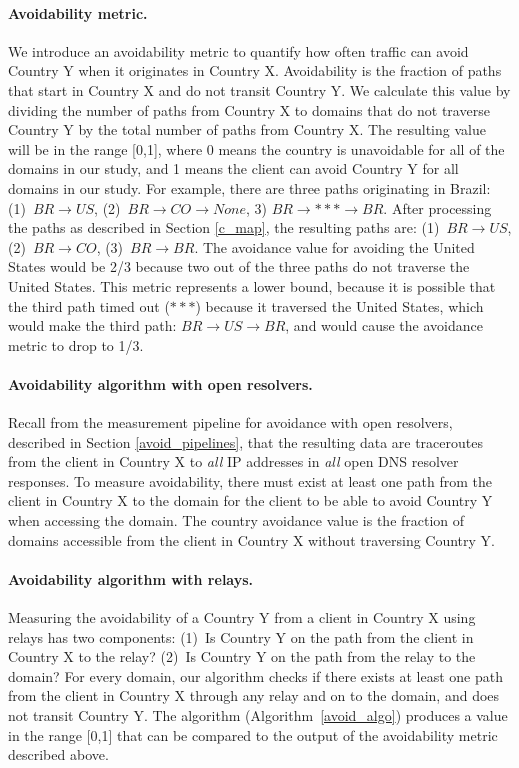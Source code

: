 \paragraph{Avoidability metric.}  We introduce an avoidability metric to
quantify how often
traffic can avoid Country Y when it originates in Country X.
Avoidability is the fraction of paths that start in Country
X and do not transit Country Y.  We calculate this value by dividing the
number of paths from Country X to domains that do not traverse Country Y
by the total number of paths from Country X. The resulting value will be
in the range [0,1], where 0 means the country is unavoidable for all of
the domains in our study, and 1 means the client can avoid Country Y for
all domains in our study.  For example, there are three paths
originating in Brazil: (1)~$BR \rightarrow US$, (2)~$BR \rightarrow CO
\rightarrow None$, 3) $BR \rightarrow *** \rightarrow BR$.  After
processing the paths as described in Section \ref{c_map}, the resulting
paths are: (1)~$BR \rightarrow US$, (2)~$BR \rightarrow CO$, (3)~$BR
\rightarrow BR$.  The avoidance value for avoiding the United States
would be 2/3 because two out of the three paths do not traverse the
United States.  This metric represents a lower bound,
because it is possible that the third path timed out ($***$) because it
traversed the United States, which would make the third path: $BR
\rightarrow US \rightarrow BR$, and would cause the avoidance metric to
drop to 1/3.

\paragraph{Avoidability algorithm with open resolvers.} Recall from the measurement pipeline for avoidance with open resolvers, described in Section \ref{avoid_pipelines}, that the resulting data are traceroutes from the client in Country X to \textit{all} IP addresses in \textit{all} open DNS resolver responses.  To measure avoidability, there must exist at least one path from the client in Country X to the domain for the client to be able to avoid Country Y when accessing the domain.  The country avoidance value is the fraction of domains accessible from the client in Country X without traversing Country Y.

\paragraph{Avoidability algorithm with relays.}  Measuring the avoidability of a Country Y from a client in Country X using relays has two components: (1)~Is Country Y on the path from the client in Country X to the relay?  (2)~Is Country Y on the path from the relay to the domain?  For every domain, our algorithm checks if there exists at least one path from the client in Country X through any relay and on to the domain, and does not transit Country Y.  
The algorithm (Algorithm~\ref{avoid_algo}) produces a value in the range
[0,1] that can be compared to the output of the avoidability metric
described above.   

